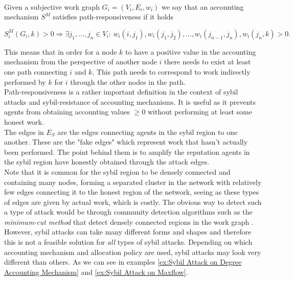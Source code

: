 \begin{definition}\ \\
\label{def:Path-responsiveness}
\noindent{}Given a subjective work graph $G_i=(V_i,E_i,w_i)$ we say that an accounting mechanism $S^M$ satisfies path-responsiveness if it holds 

\[
S^M_i(G_i,k)>0\Rightarrow\exists{}j_1,\ldots,j_n\in{}V_i:\,w_i(i,j_1),w_i(j_1,j_2),\ldots,w_i(j_{n-1},j_n),w_i(j_n,k)>0.
\]
\begin{comment}
\noindent{}Analogously, it must hold
\[
S^M_i(G_i,k)<0\Rightarrow\exists{}j_1,\ldots,l_n\in{}V_i:\,w_i(j_1,i),w_i(j_n,j_{n-1}),w_i(k,j_n)>0
\]
\end{comment}
\end{definition}


\noindent{}This means that in order for a node $k$ to have a positive value in the accounting mechanism from the perspective of another node $i$ there needs to exist at least one path connecting $i$ and $k$. This path needs to correspond to work indirectly performed by $k$ for $i$ through the other nodes in the path. \vspace{1em}\\

\noindent{}Path-responsiveness is a rather important definition in the context of sybil attacks and sybil-resistance of accounting mechanisms. It is useful as it prevents agents from obtaining accounting values $\geq{}0$ without performing at least some honest work. \vspace{1em}\\

\noindent{}The edges in $E_S$ are the edges connecting agents in the sybil region to one another. These are the "fake edges" which represent work that hasn't actually been performed. The point behind them is to amplify the reputation agents in the sybil region have honestly obtained through the attack edges.\vspace{1em}\\

\noindent{}Note that it is common for the sybil region to be densely connected and containing many nodes, forming a separated cluster in the network with relatively few edges connecting it to the honest region of the network, seeing as these types of edges are given by actual work, which is costly. The obvious way to detect such a type of attack would be through community detection algorithms such as the {\it minimum-cut method} that detect densely connected regions in the work graph \cite{Minimum-cut Community Detection}. However, sybil attacks can take many different forms and shapes and therefore this is not a feasible solution for {\it all} types of sybil attacks. Depending on which accounting mechanism and allocation policy are used, sybil attacks may look very different than others. As we can see in examples \ref{ex:Sybil Attack on Degree Accounting Mechanism} and \ref{ex:Sybil Attack on Maxflow}.\vspace{1em}\\

